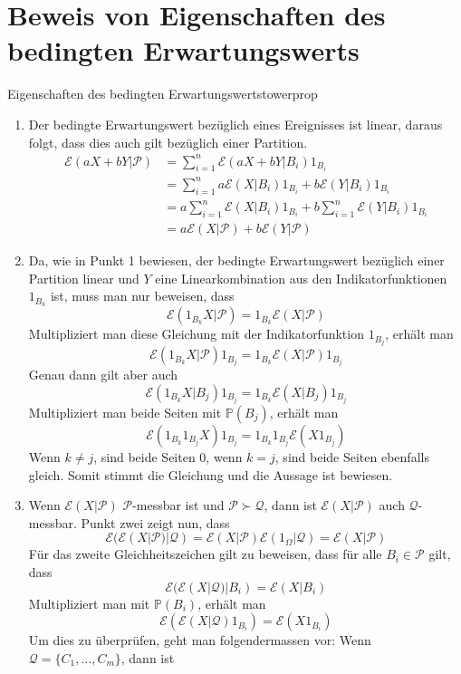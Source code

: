 \documentclass[11pt]{report} %
\begin{document}
\section{Beweis von Eigenschaften des bedingten Erwartungswerts}
    \begin{Beweis}{Eigenschaften des bedingten Erwartungswerts}{towerprop}
    \begin{enumerate}
        \item Der bedingte Erwartungswert bezüglich eines Ereignisses ist linear, daraus folgt, dass dies auch gilt bezüglich einer Partition.
        \begin{align*}
        \mathcal{E}(aX+bY|\mathcal{P})&=\sum_{i=1}^{n}\mathcal{E}(aX+bY|B_i)1_{B_i}\\
        &=\sum_{i=1}^{n}a\mathcal{E}(X|B_i)1_{B_i}+b\mathcal{E}(Y|B_i)1_{B_i}\\
        &=a\sum_{i=1}^{n}\mathcal{E}(X|B_i)1_{B_i}+b\sum_{i=1}^{n}\mathcal{E}(Y|B_i)1_{B_i}\\
        &=a\mathcal{E}(X|\mathcal{P})+b\mathcal{E}(Y|\mathcal{P})
        \end{align*}
        \item Da, wie in Punkt 1 bewiesen, der bedingte Erwartungswert bezüglich einer Partition linear und $Y$ eine Linearkombination aus den Indikatorfunktionen $1_{B_k}$ ist, muss man nur beweisen, dass $$\mathcal{E}(1_{B_k}X|\mathcal{P})=1_{B_k}\mathcal{E}(X|\mathcal{P})$$ Multipliziert man diese Gleichung mit der Indikatorfunktion $1_{B_j}$, erhält man $$\mathcal{E}(1_{B_k}X|\mathcal{P})1_{B_j}=1_{B_k}\mathcal{E}(X|\mathcal{P})1_{B_j}$$ Genau dann gilt aber auch $$\mathcal{E}(1_{B_k}X|B_j)1_{B_j}=1_{B_k}\mathcal{E}(X|B_j)1_{B_j}$$Multipliziert man beide Seiten mit $\mathbb{P}(B_j)$, erhält man $$\mathcal{E}(1_{B_k}1_{B_j}X)1_{B_j}=1_{B_k}1_{B_j}\mathcal{E}(X1_{B_j})$$ Wenn $k\neq j$, sind beide Seiten 0, wenn $k=j$, sind beide Seiten ebenfalls gleich. Somit stimmt die Gleichung und die Aussage ist bewiesen. 
    \item Wenn $\mathcal{E}(X|\mathcal{P})$ $\mathcal{P}$-messbar ist und $\mathcal{P}\succ\mathcal{Q}$, dann ist $\mathcal{E}(X|\mathcal{P})$ auch $\mathcal{Q}$-messbar. Punkt zwei zeigt nun, dass $$\mathcal{E}(\mathcal{E}(X|\mathcal{P})|\mathcal{Q})=\mathcal{E}(X|\mathcal{P})\mathcal{E}(1_\Omega|\mathcal{Q})=\mathcal{E}(X|\mathcal{P})$$ Für das zweite Gleichheitszeichen gilt zu beweisen, dass für alle $B_i\in\mathcal{P}$ gilt, dass $$\mathcal{E}(\mathcal{E}(X|\mathcal{Q})|B_i)=\mathcal{E}(X|B_i)$$Multipliziert man mit $\mathbb{P}(B_i)$, erhält man $$\mathcal{E}(\mathcal{E}(X|\mathcal{Q})1_{B_i})=\mathcal{E}(X1_{B_i})$$ Um dies zu überprüfen, geht man folgendermassen vor: Wenn $\mathcal{Q}=\{C_1, \ldots, C_m\}$, dann ist

\end{enumerate}
\end{Beweis}
\end{document}
